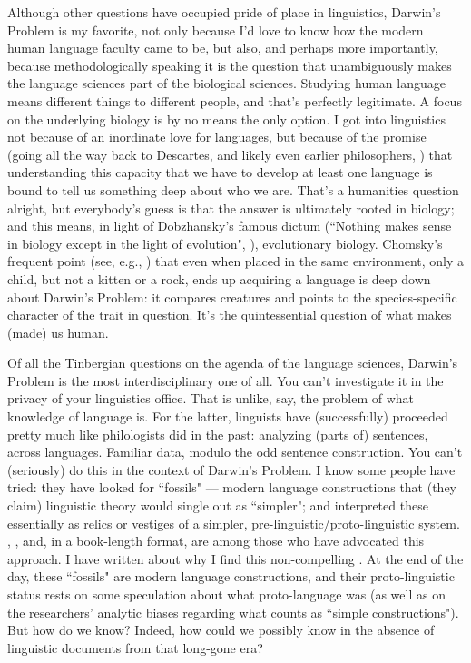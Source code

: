 Although other questions have occupied pride of place in linguistics, Darwin's Problem is my favorite, not only because I'd love to know how the modern human language faculty came to be, but also, and perhaps more importantly, because methodologically speaking it is the question that unambiguously makes the language sciences part of the biological sciences. Studying human language means different things to different people, and that's perfectly legitimate. A focus on the underlying biology is by no means the only option. I got into linguistics not because of an inordinate love for languages, but because of the promise (going all the way back to Descartes, and likely even earlier philosophers, \cite{chomsky2009cartesian}) that understanding this capacity that we have to develop at least one language is bound to tell us something deep about who we are. That's a humanities question alright, but everybody's guess is that the answer is ultimately rooted in biology; and this means, in light of Dobzhansky's famous dictum (``Nothing makes sense in biology except in the light of evolution", \cite{dobzhansky1973nothing}), evolutionary biology. Chomsky's frequent point (see, e.g., \cite{chomsky2012science}) that even when placed in the same environment, only a child, but not a kitten or a rock, ends up acquiring a language is deep down about Darwin's Problem: it compares creatures and points to the species-specific character of the trait in question. It's the quintessential question of what makes (made) us human.

Of all the Tinbergian questions on the agenda of the language sciences, Darwin's Problem is the most interdisciplinary one of all. You can't investigate it in the privacy of your linguistics office. That is unlike, say, the problem of what knowledge of language is. For the latter, linguists have (successfully) proceeded pretty much like philologists did in the past: analyzing (parts of) sentences, across languages. Familiar data, modulo the odd sentence construction. You can't (seriously) do this in the context of Darwin's Problem. I know some people have tried: they have looked for ``fossils" --- modern language constructions that (they claim) linguistic theory would single out as ``simpler"; and interpreted these essentially as relics or vestiges of a simpler, pre-linguistic/proto-linguistic system. \cite{bickerton1984language}, \cite{jackendoff1999possible}, and, in a book-length format, \cite{progovac2015evolutionary} are among those who have advocated this approach. I have written about why I find this non-compelling \citep{boeckx2016ljiljana}. At the end of the day, these ``fossils" are modern language constructions, and their proto-linguistic status rests on some speculation about what proto-language was (as well as on the researchers' analytic biases regarding what counts as ``simple constructions"). But how do we know? Indeed, how could we possibly know in the absence of linguistic documents from that long-gone era?  

